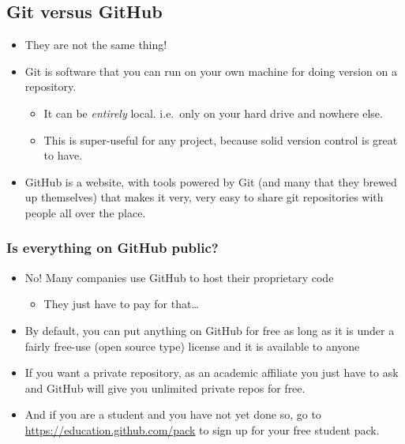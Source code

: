 \documentclass[]{book}
\providecommand{\tightlist}{%
  \setlength{\itemsep}{0pt}\setlength{\parskip}{0pt}}
\theoremstyle{definition}
\theoremstyle{definition}
\theoremstyle{remark}
\begin{document}
\subsection{Git versus GitHub}\label{git-versus-github}

\begin{itemize}
\tightlist
\item
  They are not the same thing!
\item
  Git is software that you can run on your own machine for doing version
  on a repository.

  \begin{itemize}
  \tightlist
  \item
    It can be \emph{entirely} local. i.e.~only on your hard drive and
    nowhere else.
  \item
    This is super-useful for any project, because solid version control
    is great to have.
  \end{itemize}
\item
  GitHub is a website, with tools powered by Git (and many that they
  brewed up themselves) that makes it very, very easy to share git
  repositories with people all over the place.
\end{itemize}

\subsubsection{Is everything on GitHub
public?}\label{is-everything-on-github-public}

\begin{itemize}
\tightlist
\item
  No! Many companies use GitHub to host their proprietary code

  \begin{itemize}
  \tightlist
  \item
    They just have to pay for that\ldots{}
  \end{itemize}
\item
  By default, you can put anything on GitHub for free as long as it is
  under a fairly free-use (open source type) license and it is available
  to anyone
\item
  If you want a private repository, as an academic affiliate you just
  have to ask and GitHub will give you unlimited private repos for free.
\item
  And if you are a student and you have not yet done so, go to
  \url{https://education.github.com/pack} to sign up for your free
  student pack.
\end{itemize}
\end{document}
